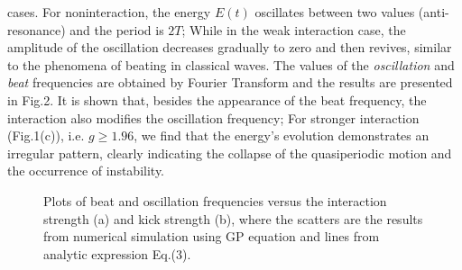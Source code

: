 \documentclass[twocolumn,prl,aps,showpacs]{revtex4}
\begin{document}
cases. For noninteraction, the
energy $E(t)$ oscillates between two values (anti-resonance) and the period is $%
2T $; While in the weak interaction case, the amplitude of the
oscillation decreases gradually to zero and then revives, similar to the
phenomena of beating in classical waves. The values
of the \textit{oscillation} and \textit{beat} frequencies are obtained by
Fourier Transform and the
results are presented in Fig.2. It is shown that, besides the
appearance of the beat frequency, the interaction also modifies the
oscillation frequency; 
For stronger interaction  (Fig.1(c)), i.e. $g\ge1.96$, we find that
the energy's evolution demonstrates an irregular pattern, clearly 
indicating the collapse of the quasiperiodic motion and the 
occurrence of instability.
\begin{figure}[!b]
\vspace*{-0.5cm}

\begin{center}

\end{center}
\vspace*{-1.0cm}
\caption{Plots of beat and oscillation frequencies versus the
interaction strength (a) and kick strength (b), where the scatters are the results from numerical
simulation using GP equation and lines from analytic expression Eq.(3).}
\label{fig:frequency}
\end{figure}

\end{document}
